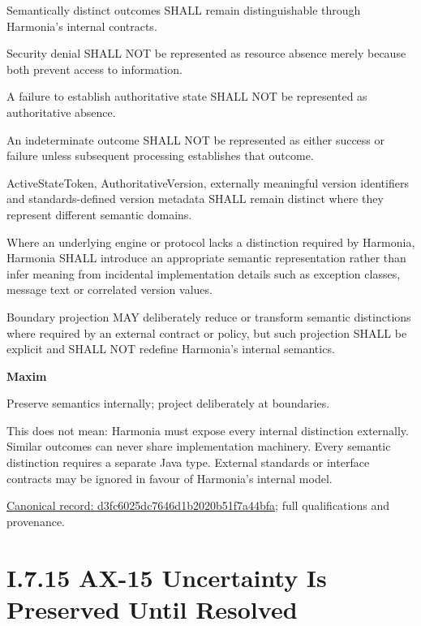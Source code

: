 Semantically distinct outcomes SHALL remain distinguishable through Harmonia's internal contracts.



Security denial SHALL NOT be represented as resource absence merely because both prevent access to information.



A failure to establish authoritative state SHALL NOT be represented as authoritative absence.



An indeterminate outcome SHALL NOT be represented as either success or failure unless subsequent processing establishes that outcome.



ActiveStateToken, AuthoritativeVersion, externally meaningful version identifiers and standards-defined version metadata SHALL remain distinct where they represent different semantic domains.



Where an underlying engine or protocol lacks a distinction required by Harmonia, Harmonia SHALL introduce an appropriate semantic representation rather than infer meaning from incidental implementation details such as exception classes, message text or correlated version values.



Boundary projection MAY deliberately reduce or transform semantic distinctions where required by an external contract or policy, but such projection SHALL be explicit and SHALL NOT redefine Harmonia's internal semantics.



\par\medskip\textbf{Maxim}\par


Preserve semantics internally; project deliberately at boundaries.



This does not mean: Harmonia must expose every internal distinction externally. Similar outcomes can never share implementation machinery. Every semantic distinction requires a separate Java type. External standards or interface contracts may be ignored in favour of Harmonia's internal model.


{\footnotesize \href{../../../../../../../../continuum/motivation/principle/d3fc6025dc7646d1b2020b51f7a44bfa.md}{Canonical record: d3fc6025dc7646d1b2020b51f7a44bfa}; full qualifications and provenance.}\par
\section*{I.7.15 AX-15 Uncertainty Is Preserved Until Resolved}
\label{navigation:I.7.15}

